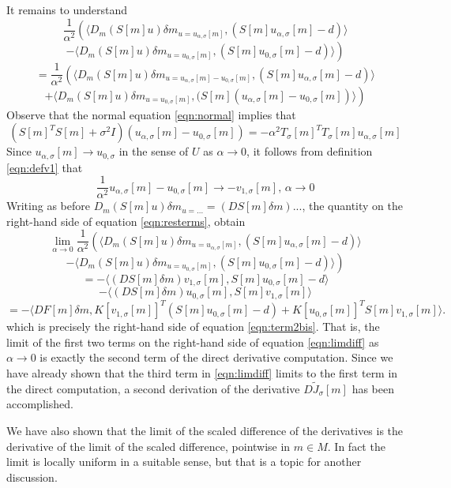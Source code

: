 It remains to understand
\[
\frac{1}{\alpha^2} \left(\langle D_m(S[m]u)\delta m_{u =  u_{\alpha,\sigma}[m]}, (S[m]u_{\alpha,\sigma}[m]-d) \rangle\right.
\]
\[
  - \left.\langle D_m(S[m]u)\delta m_{u =  u_{0,\sigma}[m]}, (S[m]u_{0,\sigma}[m]-d) \rangle\right)
\]
\[
  =\frac{1}{\alpha^2} \left(\langle D_m(S[m]u)\delta m_{u =  u_{\alpha,\sigma}[m]-u_{0,\sigma}[m]}, (S[m]u_{\alpha,\sigma}[m]-d) \rangle\right.
\]
\begin{equation}
  \label{eqn:resterms}
  + \left.\langle D_m(S[m]u)\delta m_{u =  u_{0,\sigma}[m]},
    (S[m](u_{\alpha,\sigma}[m]-u_{0,\sigma}[m]) \rangle\right)
\end{equation}
Observe that the normal equation \ref{eqn:normal} implies that
\[
  (S[m]^TS[m] + \sigma^2 I)(u_{\alpha,\sigma}[m]-u_{0,\sigma}[m]) =
  -\alpha^2 T_{\sigma}[m]^TT_{\sigma}[m]u_{\alpha,\sigma}[m]
\]
Since $u_{\alpha,\sigma}[m] \rightarrow u_{0,\sigma}$ in the sense of
$U$ as $\alpha \rightarrow 0$, it follows from definition \ref{eqn:defv1} that
\[
  \frac{1}{\alpha^2 }u_{\alpha,\sigma}[m]-u_{0,\sigma}[m] \rightarrow
  - v_{1,\sigma}[m], \, \alpha \rightarrow 0
\]
Writing as before $D_m(S[m]u)\delta m_{u =  ...} =
(DS[m]\delta m)...$,  the quantity on the right-hand side of equation
\ref{eqn:resterms}, obtain
\[
  \lim_{\alpha \rightarrow 0} 
\frac{1}{\alpha^2} \left(\langle D_m(S[m]u)\delta m_{u =  u_{\alpha,\sigma}[m]}, (S[m]u_{\alpha,\sigma}[m]-d) \rangle\right.
\]
\[
  - \left.\langle D_m(S[m]u)\delta m_{u =  u_{0,\sigma}[m]}, (S[m]u_{0,\sigma}[m]-d) \rangle\right)
\]
\[
  = - \langle (DS[m]\delta m)v_{1,\sigma}[m], S[m]u_{0,\sigma}[m]-d
  \rangle
\]
\[
  - \langle (DS[m]\delta m) u_{0,\sigma}[m],S[m]v_{1,\sigma}[m] \rangle
\]
\[
  =-\langle DF[m]\delta m, K[v_{1,\sigma}[m]]^T (S[m]u_{0,\sigma}[m]-d) + 
  K[u_{0,\sigma}[m]]^T S[m] v_{1,\sigma}[m] \rangle.
\]
which is precisely the right-hand side of equation
\ref{eqn:term2bis}. That is, the limit of the first two terms on the
right-hand side of equation \ref{eqn:limdiff} as $\alpha \rightarrow
0$ is exactly the second term of the direct derivative
computation. Since we have already shown that the third term in
\ref{eqn:limdiff} limits to
the first term in the direct computation, a second derivation of the
derivative $D\tilde{J}_{\sigma}[m]$ has been accomplished.

We have also shown that the limit of the scaled difference of the
derivatives is the derivative of the limit of the scaled difference,
pointwise in $m \in M$. In fact the limit is locally uniform in a
suitable sense, but that is a topic for another discussion.

